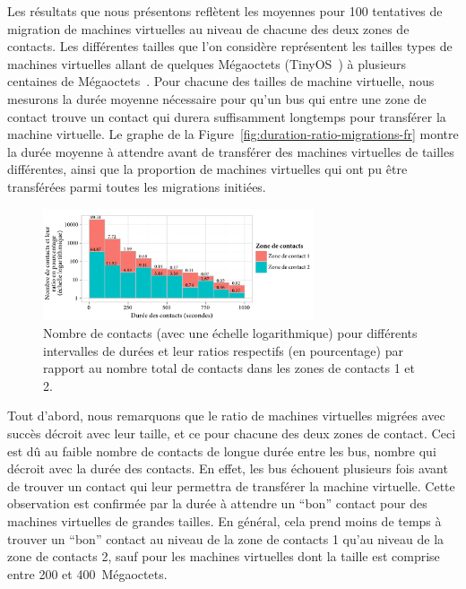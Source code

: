  
Les résultats que nous présentons reflètent les moyennes pour 100 tentatives de migration de machines virtuelles au niveau de chacune des deux zones de contacts. Les différentes tailles que l’on considère représentent les tailles types de machines virtuelles allant de quelques Mégaoctets (\eg TinyOS~\cite{levis2005tinyos}) à plusieurs centaines de Mégaoctets~\cite{clark2005live}. Pour chacune des tailles de machine virtuelle, nous mesurons la durée moyenne nécessaire pour qu’un bus qui entre une zone de contact trouve un contact qui durera suffisamment longtemps pour transférer la machine virtuelle. Le graphe de la Figure~\ref{fig:duration-ratio-migrations-fr} montre la durée moyenne à attendre avant de transférer des machines virtuelles de tailles différentes, ainsi que la proportion de machines virtuelles qui ont pu être transférées parmi toutes les migrations initiées. 
 
\begin{figure} 
    \centering 
    \vspace{-14pt} 
    \includegraphics[width=8cm]{figures-fr/contact-durations-histogram-fr.pdf} 
    \caption{Nombre de contacts (avec une échelle logarithmique) pour différents intervalles de durées et leur ratios respectifs (en pourcentage) par rapport au nombre total de contacts dans les zones de contacts 1 et 2.} 
    \label{fig:plot-contact-duration-ratio-fr} 
\end{figure} 
Tout d’abord, nous remarquons que le ratio de machines virtuelles migrées avec succès décroit avec leur taille, et ce pour chacune des deux zones de contact. Ceci est dû au faible nombre de contacts de longue durée entre les bus, nombre qui décroit avec la durée des contacts. En effet, les bus échouent plusieurs fois avant de trouver un contact qui leur permettra de transférer la machine virtuelle. Cette observation est confirmée par la durée à attendre un ``bon'' contact pour des machines virtuelles de grandes tailles. En général, cela prend moins de temps à trouver un ``bon'' contact au niveau de la zone de contacts 1 qu’au niveau de la zone de contacts 2, sauf pour les machines virtuelles dont la taille est comprise entre 200 et 400~Mégaoctets. 
 
